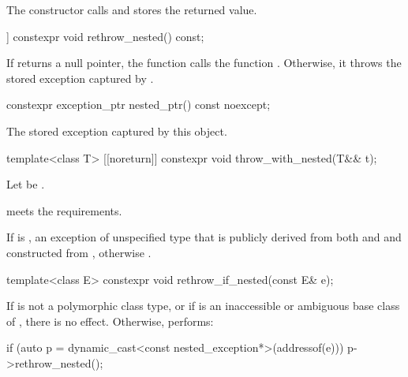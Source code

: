 \begin{itemdescr}
\pnum
\effects
The constructor calls  and stores the returned value.
\end{itemdescr}

%
\begin{itemdecl}
[[noreturn]] constexpr void rethrow_nested() const;
\end{itemdecl}

\begin{itemdescr}
\pnum
\effects
If  returns a null pointer, the function calls the function .
Otherwise, it throws the stored exception captured by .
\end{itemdescr}

%
\begin{itemdecl}
constexpr exception_ptr nested_ptr() const noexcept;
\end{itemdecl}

\begin{itemdescr}
\pnum
\returns
The stored exception captured by this  object.
\end{itemdescr}

%
\begin{itemdecl}
template<class T> [[noreturn]] constexpr void throw_with_nested(T&& t);
\end{itemdecl}

\begin{itemdescr}
\pnum
Let  be .

\pnum
\expects
{} meets the  requirements.

\pnum
\throws
If 
is ,
an exception of unspecified type that is publicly derived from both
 and 
and constructed from , otherwise
.
\end{itemdescr}

%
\begin{itemdecl}
template<class E> constexpr void rethrow_if_nested(const E& e);
\end{itemdecl}

\begin{itemdescr}
\pnum
\effects
If  is not a polymorphic class type, or
if  is an inaccessible or ambiguous base class of ,
there is no effect.
Otherwise, performs:
\begin{codeblock}
if (auto p = dynamic_cast<const nested_exception*>(addressof(e)))
  p->rethrow_nested();
\end{codeblock}
\end{itemdescr}


